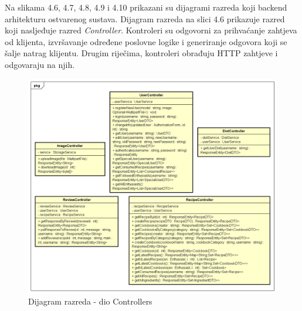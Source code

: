	  Na slikama 4.6, 4.7, 4.8, 4.9 i 4.10 prikazani su dijagrami razreda koji backend arhitekturu ostvarenog sustava. 
	  Dijagram razreda na slici 4.6 prikazuje razred koji nasljeđuje razred \textit{Controller}.  Kontroleri su odgovorni za prihvaćanje zahtjeva od klijenta, izvršavanje određene poslovne logike i generiranje odgovora koji se šalje natrag klijentu. Drugim riječima, kontroleri obrađuju HTTP zahtjeve i odgovaraju na njih.
	  
	  \begin{figure}[H]
			\includegraphics[scale=0.5]{dijagrami/UML_dijagram_razreda_controllers.png} %
			\centering
			\caption{Dijagram razreda - dio Controllers}
			\label{Dijagram razreda - dio Controllers}
		\end{figure}
			
			
			\eject 	
			

